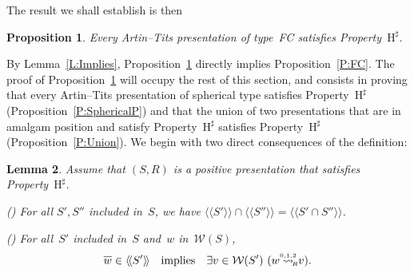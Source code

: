 \documentclass{amsart}
\numberwithin{equation}{section}
\theoremstyle{plain}
\newtheorem{prop}{Proposition}[section]
\newtheorem{lemm}[prop]{Lemma}
\theoremstyle{definition}
\newcounter{ITEM}
\begin{document}
The result we shall establish is then

\begin{prop}
\label{P:FCMain}
Every Artin--Tits presentation of type~FC satisfies Property~${{\mathrm{H}}^\sharp}$.
\end{prop}

By Lemma~\ref{L:Implies}, Proposition~\ref{P:FCMain} directly implies Proposition~\ref{P:FC}. The proof of Proposition~\ref{P:FCMain} will occupy the rest of this section, and consists in proving that every Artin--Tits presentation of spherical type satisfies Property~${{\mathrm{H}}^\sharp}$ (Proposition~\ref{P:SphericalP}) and that the union of two presentations that are in amalgam position and satisfy Property~${{\mathrm{H}}^\sharp}$ satisfies Property~${{\mathrm{H}}^\sharp}$ (Proposition~\ref{P:Union}). We begin with two direct consequences of the definition:

\begin{lemm}
\label{L:Subgroup}
Assume that $({S}, {R})$ is a positive presentation that satisfies Property~${{\mathrm{H}}^\sharp}$. 

{\setcounter{ITEM}{1}\leavevmode\hbox{\rm()}} For all ${S}',{S}''$ included in~${S}$, we have ${\langle\!\langle{{{S}'}}\rangle\!\rangle}\cap {\langle\!\langle{{{S}''}}\rangle\!\rangle} = {\langle\!\langle{{{S}'\cap {S}''}}\rangle\!\rangle}$.

{\setcounter{ITEM}{2}\leavevmode\hbox{\rm()}} For all~${S}'$ included in~${S}$ and~${w}$ in~${\mathcal{W}({S})}$, 
\begin{equation}
\label{E:Subgroup}
{\overline{\vrule width0pt height5pt{w}}} \in {\langle\!\langle{{{S}'}}\rangle\!\rangle} \quad \mbox{implies} \quad \exists {v} \in {\mathcal{W}({{S}'})}\ ({w} {\mathrel{{\mathrel{\overset{\scriptscriptstyle 0,1,2}{\rightsquigarrow}}}_{\hspace{-0.9ex}{\scriptscriptstyle R}}}} {v}).
\end{equation}
\end{lemm}
\end{document}
